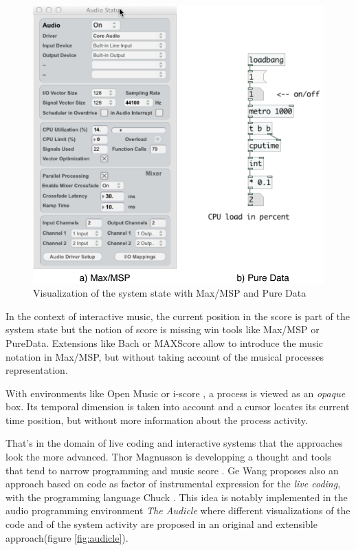 \documentclass{article}
\begin{document}
\begin{figure}[h]
\begin{center}
	\includegraphics[width=0.75\columnwidth]{imgs/max-pd}
\caption{Visualization of the system state with Max/MSP and Pure Data}
\label{fig:maxpd}
\end{center}
\end{figure}

In the context of interactive music, the current position in the score is part of the system state but the notion of score is missing win tools like Max/MSP or PureData. Extensions like Bach \cite{agostini12b} or MAXScore \cite{didko08} allow to introduce the music notation in Max/MSP, but without taking account of the musical processes representation.

With environments like Open Music \cite{Assayag:1999:CCI:1116106.1116119} or i-score \cite{AllombertDA08}, a process is viewed as an \emph{opaque} box. Its temporal dimension is taken into account and a cursor locates its current time position, but without more information about the process activity.

That's in the domain of live coding and interactive systems that the approaches look the more advanced. 
Thor Magnusson is developping a thought and tools that tend to narrow programming and music score \cite{magnusson:07,magnuss11}.
Ge Wang proposes also an approach based on code \cite{Wang04on-the-flyprogramming:} as factor of instrumental expression for the \emph{live coding}, with the programming language Chuck \cite{Wang03chuck:a}. This idea is notably implemented in the audio programming environment  \emph{The Audicle} \cite{Wang04theaudicle} where different visualizations of the code and of the system activity are proposed in an original and extensible approach(figure \ref{fig:audicle}).
\end{document}
